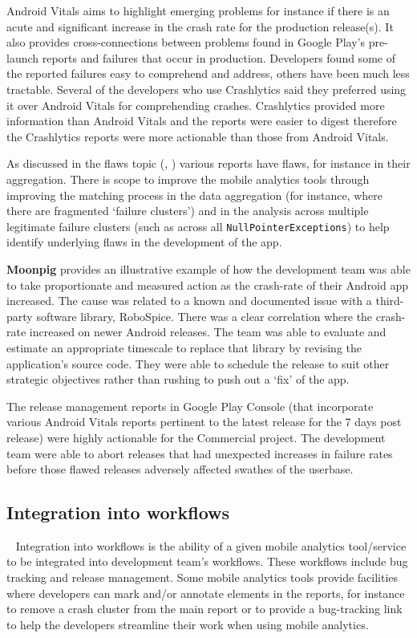 Android Vitals aims to highlight emerging problems for instance if there is an acute and significant increase in the crash rate for the production release(s). It also provides cross-connections between problems found in Google Play's pre-launch reports and failures that occur in production. Developers found some of the reported failures easy to comprehend and address, others have been much less tractable. Several of the developers who use Crashlytics said they preferred using it over Android Vitals for comprehending crashes. Crashlytics provided more information than Android Vitals and the reports were easier to digest therefore the Crashlytics reports were more actionable than those from Android Vitals.

As discussed in the flaws topic (, ) various reports have flaws, for instance in their aggregation. There is scope to improve the mobile analytics tools through improving the matching process in the data aggregation (for instance, where there are fragmented `failure clusters') and in the analysis across multiple legitimate failure clusters (such as across all \texttt{NullPointerExceptions}) to help identify underlying flaws in the development of the app.

\textbf{Moonpig} provides an illustrative example of how the development team was able to take proportionate and measured action as the crash-rate of their Android app increased. The cause was related to a known and documented issue with a third-party software library, RoboSpice. There was a clear correlation where the crash-rate increased on newer Android releases. The team was able to evaluate and estimate an appropriate timescale to replace that library by revising the application's source code. They were able to schedule the release to suit other strategic objectives rather than rushing to push out a `fix' of the app.

The release management reports in Google Play Console (that incorporate various Android Vitals reports pertinent to the latest release for the 7 days post release) were highly actionable for the Commercial project. The development team were able to abort releases that had unexpected increases in failure rates before those flawed releases adversely affected swathes of the userbase.

\subsection{Integration into workflows}~\label{section-integration-into-workflows}
Integration into workflows is the ability of a given mobile analytics tool/service to be integrated into development team's workflows. These workflows include bug tracking and release management. Some mobile analytics tools provide facilities where developers can mark and/or annotate elements in the reports, for instance to remove a crash cluster from the main report or to provide a bug-tracking link to help the developers streamline their work when using mobile analytics.

